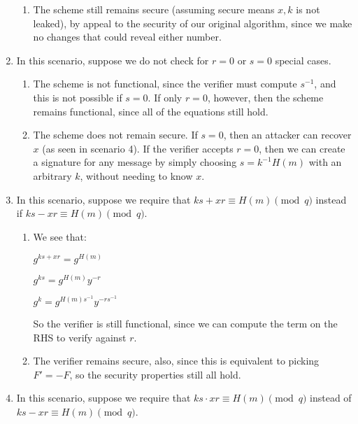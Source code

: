 \begin{enumerate}
\begin{enumerate}
          \item
            The scheme still remains secure (assuming secure means $x, k$ is not leaked), by appeal to the security of our original algorithm, since we make no changes that could reveal either number.
        \end{enumerate}

      \item
        In this scenario, suppose we do not check for $r=0$ or $s=0$ special cases.

        \begin{enumerate}
          \item
            The scheme is not functional, since the verifier must compute $s^{-1}$, and this is not possible if $s=0$. If only $r=0$, however, then the scheme remains functional, since all of the equations still hold.

          \item
            The scheme does not remain secure. If $s=0$, then an attacker can recover $x$ (as seen in scenario 4). If the verifier accepts $r=0$, then we can create a signature for any message by simply choosing $s = k^{-1} H(m)$ with an arbitrary $k$, without needing to know $x$.
        \end{enumerate}

      \item
        In this scenario, suppose we require that $ks + xr \equiv H(m) \pmod{q}$ instead if $ks - xr \equiv H(m) \pmod{q}$.

        \begin{enumerate}
          \item
            We see that:

            $g^{ks + xr} = g^{H(m)}$

            $g^{ks} = g^{H(m)}y^{-r}$

            $g^k = g^{H(m)s^{-1}}y^{-rs^{-1}}$

            So the verifier is still functional, since we can compute the term on the RHS to verify against $r$.

          \item
            The verifier remains secure, also, since this is equivalent to picking $F' = -F$, so the security properties still all hold.
        \end{enumerate}

      \item

        In this scenario, suppose we require that $ks \cdot xr \equiv H(m) \pmod{q}$ instead of $ks - xr \equiv H(m) \pmod{q}$.


\end{enumerate}
